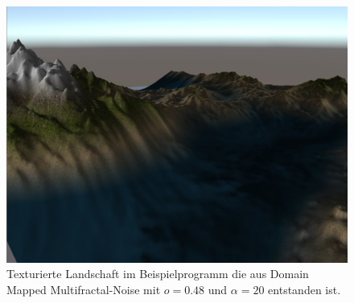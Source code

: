 \begin{figure}
	\centering
	\includegraphics[width=\textwidth]{images/domainwarped_rendered.png}
	\caption{Texturierte Landschaft im Beispielprogramm die aus Domain Mapped Multifractal-Noise mit $o=0.48$ und $\alpha=20$ entstanden ist.}\label{img.multiRendered}
\end{figure}








